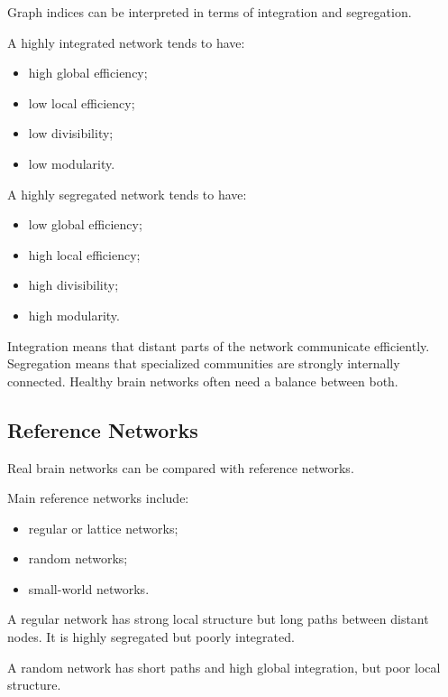 Graph indices can be interpreted in terms of integration and segregation.

A highly integrated network tends to have:

\begin{itemize}[noitemsep]
    \item high global efficiency;
    \item low local efficiency;
    \item low divisibility;
    \item low modularity.
\end{itemize}

A highly segregated network tends to have:

\begin{itemize}[noitemsep]
    \item low global efficiency;
    \item high local efficiency;
    \item high divisibility;
    \item high modularity.
\end{itemize}

\begin{authornote}
Integration means that distant parts of the network communicate efficiently. Segregation means that specialized communities are strongly internally connected. Healthy brain networks often need a balance between both.
\end{authornote}

\subsection{Reference Networks}

Real brain networks can be compared with reference networks.

Main reference networks include:

\begin{itemize}[noitemsep]
    \item regular or lattice networks;
    \item random networks;
    \item small-world networks.
\end{itemize}

A regular network has strong local structure but long paths between distant nodes. It is highly segregated but poorly integrated.

A random network has short paths and high global integration, but poor local structure.

